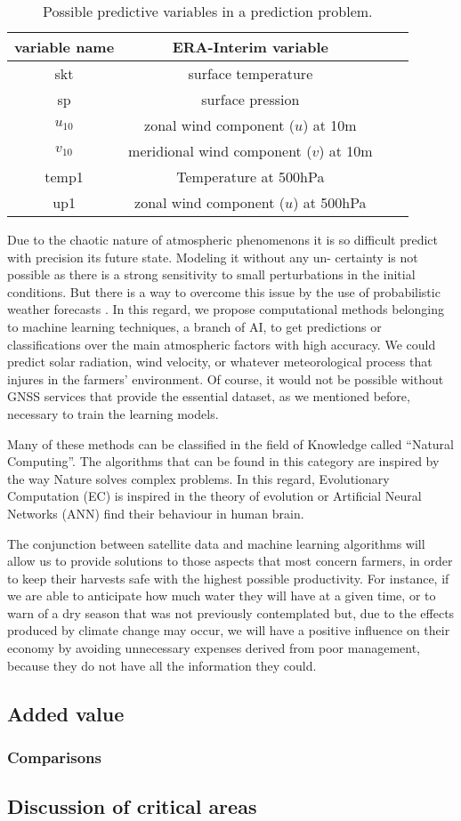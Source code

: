\vspace{12pt}
\begin{table}[H]
\begin{center}
\caption{\label{Variables_ERA} Possible predictive variables in a prediction problem.}
\begin{tabular}{cccc}
\hline
variable name & ERA-Interim variable\\
\hline
\hline
skt & surface temperature\\
sp & surface pression\\
$u_{10}$& zonal wind component ($u$) at 10m\\
$v_{10}$& meridional wind component ($v$) at 10m\\
temp1& Temperature at 500hPa\\
up1& zonal wind component ($u$) at 500hPa\\
\hline
\end{tabular}
\end{center}
\end{table}
\vspace{12pt}

Due to the chaotic nature of atmospheric phenomenons it is so difficult predict with precision its future state. Modeling it without any un- certainty is not possible as there is a strong sensitivity to small perturbations in the initial conditions. But there is a way to overcome this issue by the use of probabilistic weather forecasts \cite{martinez2015forecasting}. In this regard, we propose computational methods belonging to machine learning techniques, a branch of AI, to get predictions or classifications over the main atmospheric factors with high accuracy. We could predict solar radiation, wind velocity, or whatever meteorological process that injures in the farmers' environment. Of course, it would not be possible without GNSS services that provide the essential dataset, as we mentioned before, necessary to train the learning models.

Many of these methods can be classified in the field of Knowledge called “Natural Computing”. The algorithms that can be found in this category are inspired by the way Nature solves complex problems. In this regard, Evolutionary Computation (EC) is inspired in the theory of evolution or Artificial Neural Networks (ANN) find their behaviour in human brain.

The conjunction between satellite data and machine learning algorithms will allow us to provide solutions to those aspects that most concern farmers, in order to keep their harvests safe with the highest possible productivity. For instance, if we are able to anticipate how much water they will have at a given time, or to warn of a dry season that was not previously contemplated but, due to the effects produced by climate change may occur, we will have a positive influence on their economy by avoiding unnecessary expenses derived from poor management, because they do not have all the information they could.

\subsection{Added value}
\subsubsection{Comparisons}	
\subsection{Discussion of critical areas}
